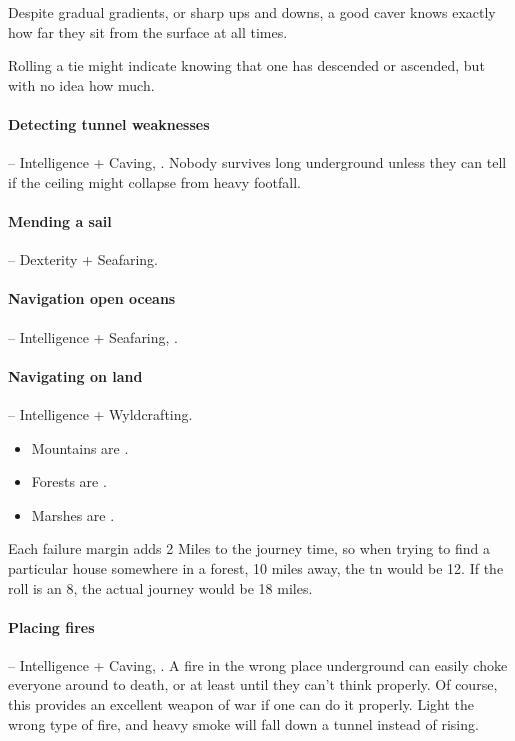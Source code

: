 \begin{multicols}{2}
Despite gradual gradients, or sharp ups and downs, a good caver knows exactly how far they sit from the surface at all times.

Rolling a tie might indicate knowing that one has descended or ascended, but with no idea how much.

\paragraph{Detecting tunnel weaknesses} -- Intelligence + Caving, .
Nobody survives long underground unless they can tell if the ceiling might collapse from heavy footfall.

\paragraph{Mending a sail} -- Dexterity + Seafaring.

\paragraph{Navigation open oceans} -- Intelligence + Seafaring, .

\paragraph{Navigating on land} -- Intelligence + Wyldcrafting.
\label{marching}
\begin{itemize}

  \item
    Mountains are .
  \item
    Forests are .
  \item
    Marshes are .

\end{itemize}

Each failure margin adds 2 Miles to the journey time, so when trying to find a particular house somewhere in a forest, 10 miles away, the \gls{tn} would be 12.
If the roll is an 8, the actual journey would be 18 miles.


\paragraph{Placing fires} -- Intelligence + Caving, .
A fire in the wrong place underground can easily choke everyone around to death, or at least until they can't think properly.
Of course, this provides an excellent weapon of war if one can do it properly.
Light the wrong type of fire, and heavy smoke will fall down a tunnel instead of rising.


\end{multicols}

